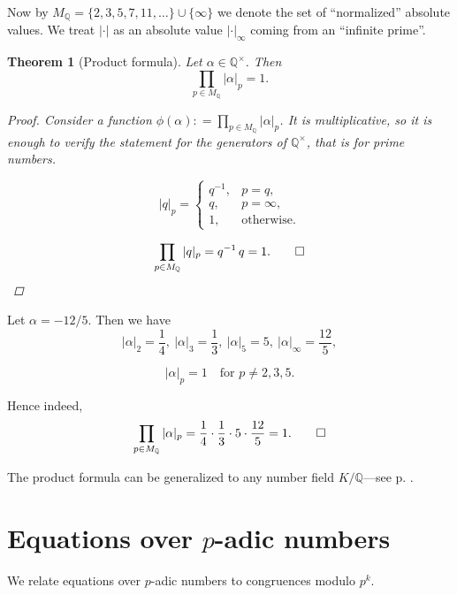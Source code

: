 \documentclass{article}
\newcommand{\dfn}{\mathrel{\mathop:}=}
\newcommand{\QQ}{\mathbb{Q}}
\newcommand{\examplesymbol}{$\blacktriangle$}
\renewcommand{\qedsymbol}{$\blacksquare$}
\theoremstyle{myplain}
\newtheorem{theorem}[proposition]{Theorem}
\theoremstyle{mydefinition}
\newenvironment{example}
  {\pushQED{\qed}\renewcommand{\qedsymbol}{\examplesymbol}\examplex}
  {\popQED\endexamplex}
\begin{document}
Now by $M_\QQ = \{ 2, 3, 5, 7, 11, \ldots \} \cup \{\infty\}$ we denote the set
of ``normalized'' absolute values. We treat $|\cdot|$ as an absolute value
$|\cdot|_\infty$ coming from an ``infinite prime''.

\begin{theorem}[Product formula]\label{theorem:product-formula-Q}
  Let $\alpha \in \QQ^\times$. Then
  $$\prod_{p \in M_\QQ} |\alpha|_p = 1.$$

  \begin{proof}
    Consider a function $\phi (\alpha) \dfn \prod_{p\in M_\QQ} |\alpha|_p$.
    It is multiplicative, so it is enough to verify the statement for the
    generators of $\QQ^\times$, that is for prime numbers.

    \[ |q|_p = \left\{\begin{array}{ll}
                        q^{-1}, & p = q,\\
                        q, & p = \infty,\\
                        1, & \text{otherwise}.
                      \end{array}\right. \]

    \[ \prod_{p\in M_\QQ} |q|_p = q^{-1}\,q = 1. \qedhere \]
  \end{proof}
\end{theorem}

\begin{example}
  Let $\alpha = - 12/5$. Then we have
  \[ |\alpha|_2 = \frac{1}{4}, ~
    |\alpha|_3 = \frac{1}{3}, ~
    |\alpha|_5 = 5, ~
    |\alpha|_\infty = \frac{12}{5}, \]

  \[ |\alpha|_p = 1 \quad\text{for } p \ne 2,3,5. \]

  Hence indeed,
  \[ \prod_{p\in M_\QQ} |\alpha|_p =
    \frac{1}{4}\cdot \frac{1}{3}\cdot 5\cdot \frac{12}{5} = 1. \qedhere \]
\end{example}

The product formula can be generalized to any number field $K/\QQ$---see
p. \pageref{product-formula-K}.

\section{Equations over $p$-adic numbers}

We relate equations over $p$-adic numbers to congruences modulo $p^k$.
\end{document}
